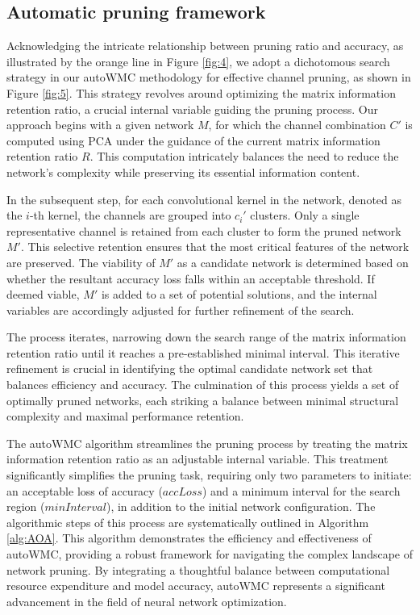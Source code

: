 \documentclass[sigconf, 10pt]{acmart}
\begin{document}
\subsection{Automatic pruning framework}

Acknowledging the intricate relationship between pruning ratio and accuracy, as illustrated by the orange line in Figure \ref{fig:4}, we adopt a dichotomous search strategy in our autoWMC methodology for effective channel pruning, as shown in Figure \ref{fig:5}. This strategy revolves around optimizing the matrix information retention ratio, a crucial internal variable guiding the pruning process. Our approach begins with a given network \( M \), for which the channel combination \( C' \) is computed using PCA under the guidance of the current matrix information retention ratio \( R \). This computation intricately balances the need to reduce the network's complexity while preserving its essential information content.

In the subsequent step, for each convolutional kernel in the network, denoted as the \( i \)-th kernel, the channels are grouped into \( c_i' \) clusters. Only a single representative channel is retained from each cluster to form the pruned network \( M' \). This selective retention ensures that the most critical features of the network are preserved. The viability of \( M' \) as a candidate network is determined based on whether the resultant accuracy loss falls within an acceptable threshold. If deemed viable, \( M' \) is added to a set of potential solutions, and the internal variables are accordingly adjusted for further refinement of the search.

The process iterates, narrowing down the search range of the matrix information retention ratio until it reaches a pre-established minimal interval. This iterative refinement is crucial in identifying the optimal candidate network set that balances efficiency and accuracy. The culmination of this process yields a set of optimally pruned networks, each striking a balance between minimal structural complexity and maximal performance retention.

The autoWMC algorithm streamlines the pruning process by treating the matrix information retention ratio as an adjustable internal variable. This treatment significantly simplifies the pruning task, requiring only two parameters to initiate: an acceptable loss of accuracy (\( accLoss \)) and a minimum interval for the search region (\( minInterval \)), in addition to the initial network configuration. The algorithmic steps of this process are systematically outlined in Algorithm \ref{alg:AOA}. This algorithm demonstrates the efficiency and effectiveness of autoWMC, providing a robust framework for navigating the complex landscape of network pruning. By integrating a thoughtful balance between computational resource expenditure and model accuracy, autoWMC represents a significant advancement in the field of neural network optimization.
\end{document}
